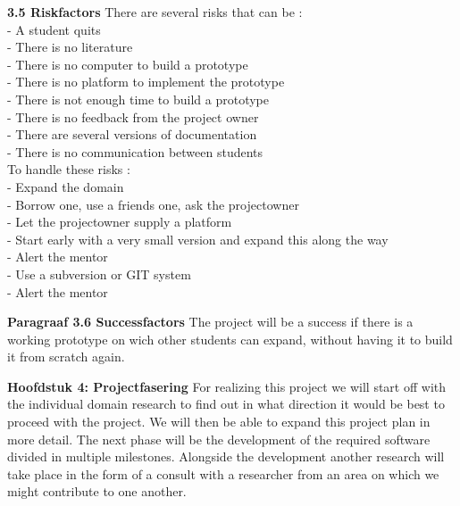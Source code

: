 \documentclass{article}
\begin{document}
\noindent
\textbf{3.5 Riskfactors}
\newline
There are several risks that can be :\\
- A student quits\\
- There is no literature\\
- There is no computer to build a prototype\\
- There is no platform to implement the prototype\\
- There is not enough time to build a prototype\\
- There is no feedback from the project owner\\
- There are several versions of documentation\\
- There is no communication between students\\
\newline
To handle these risks :\\
- Expand the domain\\
- Borrow one, use a friends one, ask the projectowner\\
- Let the projectowner supply a platform\\
- Start early with  a very small version and expand this along the way\\
- Alert the mentor\\
- Use a subversion or GIT system\\
- Alert the mentor\\
\newline

\noindent
\textbf{Paragraaf 3.6 Successfactors}
\newline
The project will be a success if there is a working prototype on wich other students can expand, without having it to build it from scratch again.
\newline

\textbf{Hoofdstuk 4: Projectfasering}
For realizing this project we will start
 off with the individual domain research to find out in what direction it would be best to proceed with the project. We will then be able to expand this project plan in more detail. The next phase will be the development of the required software divided in multiple milestones. Alongside the development another research will take place in the form of a consult with a researcher from an area on which we might contribute to one another.
\newline
\end{document}
